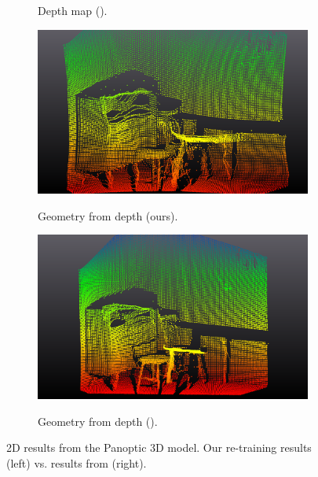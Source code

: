 \begin{figure}[h]
\begin{subfigure}[b]{0.45\linewidth}
    \label{subfig:sub2}
   \vspace*{-3mm} %
  \caption{Depth map (\citep{dahnert2021panoptic}).}
  \end{subfigure}

  \vspace{0.03\linewidth} %

  \begin{subfigure}[b]{0.45\linewidth}
    \centering
    \includegraphics[width=\linewidth]{figs/depthply_ours.png}
    \label{subfig:sub3}
   \vspace*{-3mm} %
   \caption{Geometry from depth (ours).}
  \end{subfigure}
  \hfill
  \begin{subfigure}[b]{0.45\linewidth}
    \centering
    \includegraphics[width=\linewidth]{figs/depthply_pan.png}
    \label{subfig:sub4}
   \vspace*{-3mm} %
   \caption{Geometry from depth (\citep{dahnert2021panoptic}).}
  \end{subfigure}

  \caption{2D results from the Panoptic 3D model. Our re-training results (left) vs. results from \citet{dahnert2021panoptic} (right).}
  \label{fig:qual_panoptic}
\end{figure}

